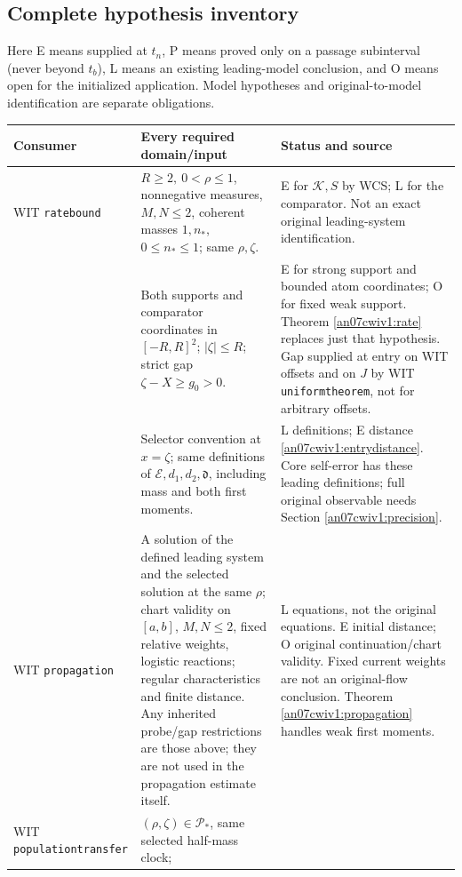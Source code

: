 \documentclass[11pt]{article}
\numberwithin{equation}{section}
\theoremstyle{remark}\newtheorem{remark}[theorem]{Remark}
\newcommand{\KK}{\mathcal K}\newcommand{\BB}{\mathcal B}
\newcommand{\dist}{\mathfrak d}
\begin{document}
\subsection{Complete hypothesis inventory}
\label{an07cwiv1:inventory}
Here E means supplied at \(t_n\), P means proved only on a
passage subinterval (never beyond \(t_b\)), L means an existing
leading-model conclusion, and O means open for the initialized
application. Model hypotheses and original-to-model identification
are separate obligations.
\small
\begin{longtable}{>{\raggedright\arraybackslash}p{}>{\raggedright\arraybackslash}p{}>{\raggedright\arraybackslash}p{}}
\toprule Consumer & Every required domain/input & Status and source\\\midrule
\endhead
WIT \texttt{ratebound}
& \(R\ge2,\ 0<\rho\le1\), nonnegative measures,
 \(M,N\le2\), coherent masses \(1,n_*\), \(0\le n_*\le1\);
 same \(\rho,\zeta\).
& E for \(\KK,S\) by WCS; L for the comparator.
 Not an exact original leading-system identification.\\
& Both supports and comparator coordinates in \([-R,R]^2\);
 \(|\zeta|\le R\); strict gap \(\zeta-X\ge g_0>0\).
& E for strong support and bounded atom coordinates; O for fixed
 weak support. Theorem \ref{an07cwiv1:rate} replaces just that
 hypothesis. Gap supplied at entry on WIT offsets and on \(J\)
 by WIT \texttt{uniformtheorem}, not for arbitrary offsets.\\
& Selector convention at \(x=\zeta\); same definitions of
 \(\mathcal E,d_1,d_2,\dist\), including mass and both first moments.
& L definitions; E distance \eqref{an07cwiv1:entrydistance}.
 Core self-error has these leading definitions; full original
 observable needs Section \ref{an07cwiv1:precision}.\\
WIT \texttt{propagation}
& A solution of the defined leading system and the selected
 solution at the same \(\rho\); chart validity on \([a,b]\),
 \(M,N\le2\), fixed relative weights, logistic reactions;
 regular characteristics and finite distance. Any inherited
 probe/gap restrictions are those above; they are not used
 in the propagation estimate itself.
& L equations, not the original equations. E initial distance;
 O original continuation/chart validity. Fixed current weights
 are not an original-flow conclusion. Theorem
 \ref{an07cwiv1:propagation} handles weak first moments.\\
WIT \texttt{population\-transfer}
& \((\rho,\zeta)\in\mathcal P_*\), same selected half-mass clock;

\end{longtable}
\end{document}
